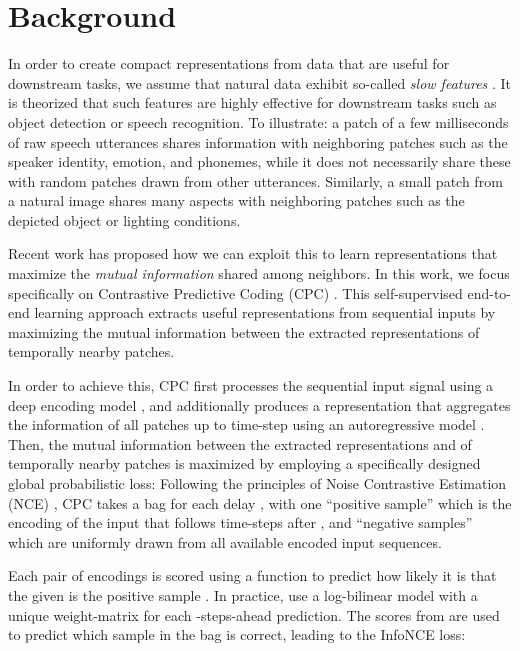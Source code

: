 \documentclass{article}
\begin{document}
\section{Background}
\label{sec:CPC}
In order to create compact representations from data that are useful for downstream tasks, we assume that natural data exhibit so-called \textit{slow features} \citep{Wiskott2002-dn}. It is theorized that such features are highly effective for downstream tasks such as object detection or speech recognition. To illustrate: a patch of a few milliseconds of raw speech utterances shares information with neighboring patches such as the speaker identity, emotion, and phonemes, while it does not necessarily share these with random patches drawn from other utterances. Similarly, a small patch from a natural image shares many aspects with neighboring patches such as the depicted object or lighting conditions. 

Recent work \citep{oord2018representation,hjelm2018learning} has proposed how we can exploit this to learn representations that maximize the \textit{mutual information} shared among neighbors. In this work, we focus specifically on Contrastive Predictive Coding (CPC) \citep{oord2018representation}. This self-supervised end-to-end learning approach extracts useful representations from sequential inputs by maximizing the mutual information between the extracted representations of temporally nearby patches.

In order to achieve this, CPC first processes the sequential input signal  using a deep encoding model , and additionally produces a representation  that aggregates the information of all patches up to time-step  using an autoregressive model . Then, the mutual information between the extracted representations  and  of temporally nearby patches is maximized by employing a specifically designed global probabilistic loss: Following the principles of Noise Contrastive Estimation (NCE) \citep{gutmann2010noise}, CPC takes a bag  for each delay , with one ``positive sample''  which is the encoding of the input that follows  time-steps after , and  ``negative samples''  which are uniformly drawn from all available encoded input sequences.

Each pair of encodings  is scored using a function  to predict how likely it is that the given  is the positive sample . In practice, \citet{oord2018representation} use a log-bilinear model 
with a unique weight-matrix  for each -steps-ahead prediction. The scores from  are used to predict which sample in the bag  is correct, leading to the InfoNCE loss:
\end{document}
